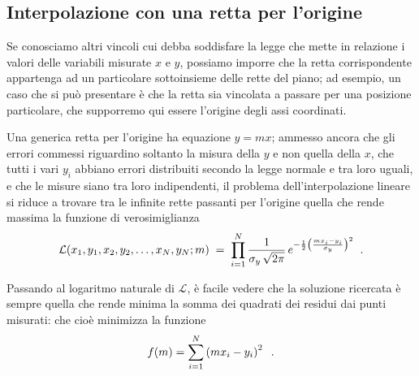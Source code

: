\subsection{Interpolazione con una retta per l'origine}%
Se conosciamo altri vincoli cui debba soddisfare la legge
che mette in relazione i valori delle variabili misurate $x$
e $y$, possiamo imporre che la retta corrispondente
appartenga ad un particolare sottoinsieme delle rette del
piano; ad esempio, un caso che si pu\`o presentare \`e che
la retta sia vincolata a passare per una posizione
particolare, che supporremo qui essere l'origine degli assi
coordinati.

Una generica retta per l'origine ha equazione $y=mx$;
ammesso ancora che gli errori commessi riguardino soltanto
la misura della $y$ e non quella della $x$, che tutti i vari
$y_i$ abbiano errori distribuiti secondo la legge normale e
tra loro uguali, e che le misure siano tra loro
indipendenti, il problema dell'interpolazione lineare si
riduce a trovare tra le infinite rette passanti per
l'origine quella che rende massima la funzione di
verosimiglianza
\begin{equation*}
  \mathcal{L} (x_1, y_1, x_2, y_2,\ldots,x_N, y_N ;
    m) \; = \; \prod_{i=1}^N \frac{1}{\sigma_y \,
    \sqrt{2 \pi}} \,  e^{- \frac{1}{2}
    \left( \frac{m x_i - y_i}{\sigma_y} \right)
    ^2 } \peq .
\end{equation*}

Passando al logaritmo naturale di $\mathcal{L}$, \`e facile
vedere che la soluzione ricercata \`e sempre quella che
rende minima la somma dei quadrati dei residui dai punti
misurati: che cio\`e minimizza la funzione
\begin{equation*}
  f(m) = \sum_{i=1}^N \left( m x_i - y_i \right) ^2 \;\; .
\end{equation*}

